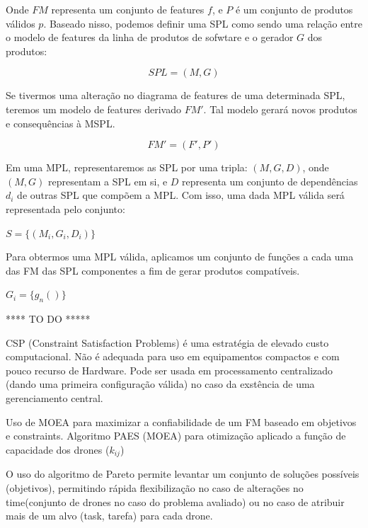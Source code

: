 \documentclass[12pt,oneside, a4paper]{article}
\begin{document}
Onde $ FM $ representa um conjunto de features $ f $, e $ P $ é um conjunto de produtos válidos $ p $. Baseado nisso, podemos definir uma SPL como sendo uma relação entre o modelo de features da linha de produtos de sofwtare e o gerador $ G $ dos produtos:

\begin{equation}
SPL = (M, G)
\end{equation}

Se tivermos uma alteração no diagrama de features de uma determinada SPL, teremos um modelo de features derivado $ FM' $. Tal modelo gerará novos produtos e consequências à MSPL.

\begin{equation}
FM' = (F', P')
\end{equation}

Em uma MPL, representaremos as SPL por uma tripla: $(M, G, D)$, onde $(M,G)$ representam a SPL em si, e $D$ representa um conjunto de dependências $d_{i}$ de outras SPL que compõem a MPL. Com isso, uma dada MPL válida será representada pelo conjunto:

\begin{center}
$S=\{(M_{i},G_{i},D_{i})\}$
\end{center}

Para obtermos uma MPL válida, aplicamos um conjunto de funções a cada uma das FM das SPL componentes a fim de gerar produtos compatíveis. 

\begin{center}
$  G_{i} = \{g_{n}()\} $
\end{center}




**** TO DO *****


CSP (Constraint Satisfaction Problems) é uma estratégia de elevado custo computacional. Não é adequada para uso em equipamentos compactos e com pouco recurso de Hardware. Pode ser usada em processamento centralizado (dando uma primeira configuração válida) no caso da exstência de uma gerenciamento central.

Uso de MOEA para maximizar a confiabilidade de um FM baseado em objetivos e constraints. Algoritmo PAES (MOEA) para otimização aplicado a função de capacidade dos drones ($k_{ij}$)

O uso do algoritmo de Pareto permite levantar um conjunto de soluções possíveis (objetivos), permitindo rápida flexibilização no caso de alterações no time(conjunto de drones no caso do problema avaliado) ou no caso de atribuir mais de um alvo (task, tarefa) para cada drone.
\end{document}
